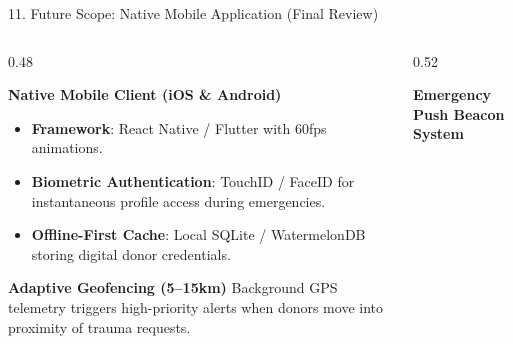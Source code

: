 \documentclass[aspectratio=169,10pt]{beamer}
\begin{document}
\begin{frame}{11. Future Scope: Native Mobile Application (Final Review)}
    \begin{columns}[T]
        \begin{column}{0.48\textwidth}
            \begin{alertblock}{\textbf{Native Mobile Client (iOS \& Android)}}
                \scriptsize
                \begin{itemize}
                    \item \textbf{Framework}: React Native / Flutter with 60fps animations.
                    \item \textbf{Biometric Authentication}: TouchID / FaceID for instantaneous profile access during emergencies.
                    \item \textbf{Offline-First Cache}: Local SQLite / WatermelonDB storing digital donor credentials.
                \end{itemize}
            \end{alertblock}
            \begin{exampleblock}{\textbf{Adaptive Geofencing (5--15km)}}
                \scriptsize Background GPS telemetry triggers high-priority alerts when donors move into proximity of trauma requests.
            \end{exampleblock}
        \end{column}
        \begin{column}{0.52\textwidth}
            \begin{block}{\textbf{Emergency Push Beacon System}}
                \begin{center}
                \end{center}
            \end{block}
        \end{column}
    \end{columns}
\end{frame}
\end{document}
